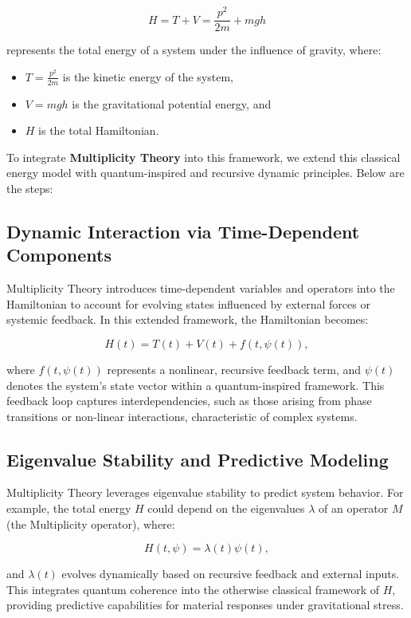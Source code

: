 \documentclass{article}
\theoremstyle{plain}
\begin{document}
\[
H = T + V = \frac{p^2}{2m} + mgh
\]

represents the total energy of a system under the influence of gravity, where:

\begin{itemize}
    \item \( T = \frac{p^2}{2m} \) is the kinetic energy of the system,
    \item \( V = mgh \) is the gravitational potential energy, and
    \item \( H \) is the total Hamiltonian.
\end{itemize}

To integrate \textbf{Multiplicity Theory} into this framework, we extend this classical energy model with quantum-inspired and recursive dynamic principles. Below are the steps:

\subsection{Dynamic Interaction via Time-Dependent Components}
Multiplicity Theory introduces time-dependent variables and operators into the Hamiltonian to account for evolving states influenced by external forces or systemic feedback. In this extended framework, the Hamiltonian becomes:

\[
H(t) = T(t) + V(t) + f(t, \psi(t)),
\]

where \( f(t, \psi(t)) \) represents a nonlinear, recursive feedback term, and \( \psi(t) \) denotes the system's state vector within a quantum-inspired framework. This feedback loop captures interdependencies, such as those arising from phase transitions or non-linear interactions, characteristic of complex systems.

\subsection{Eigenvalue Stability and Predictive Modeling}
Multiplicity Theory leverages eigenvalue stability to predict system behavior. For example, the total energy \( H \) could depend on the eigenvalues \( \lambda \) of an operator \( M \) (the Multiplicity operator), where:

\[
H(t, \psi) = \lambda(t) \psi(t),
\]

and \( \lambda(t) \) evolves dynamically based on recursive feedback and external inputs. This integrates quantum coherence into the otherwise classical framework of \( H \), providing predictive capabilities for material responses under gravitational stress.
\end{document}
